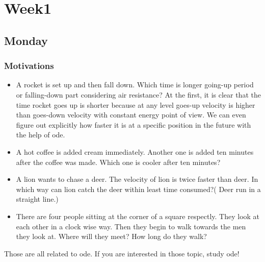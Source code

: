 
\chapter{Week1}

\section{Monday}
\subsection{Motivations}
\begin{itemize}
\item A rocket is set up and then fall down. Which time is longer going-up period or falling-down part considering air resistance? At the first, it is clear that the time rocket goes up is shorter because at any level goes-up velocity is higher than goes-down velocity with constant energy point of view. We can even figure out explicitly how faster it is at a specific position in the future with the help of ode.
\item A hot coffee is added cream immediately. Another one is added ten minutes after the coffee was made. Which one is cooler after ten minutes?
\item A lion wants to chase a deer. The velocity of lion is twice faster than deer. In which way can lion catch the deer within least time consumed?( Deer run in a straight line.)
\item There are four people sitting at the corner of a square respectly. They look at each other in a clock wise way. Then they begin to walk towards the men they look at. Where will they meet? How long do they walk?
\end{itemize}
Those are all related to ode. If you are interested in those topic, study ode!
